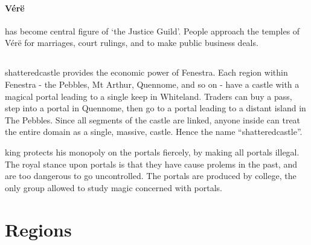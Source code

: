 \begin{multicols}{2}
\paragraph{V\'{e}r\"{e}} has become central figure of `the Justice Guild'.
People approach the temples of V\'{e}r\"{e} for marriages, court rulings, and to make public business deals.

\subsection{}

\Gls{shatteredcastle} provides the economic power of Fenestra.
Each region within Fenestra - the Pebbles, Mt Arthur, Quennome, and so on - have a castle with a magical portal leading to a single keep in Whiteland.
Traders can buy a pass, step into a portal in Quennome, then go to a portal leading to a distant island in The Pebbles.
Since all segments of the castle are linked, anyone inside can treat the entire domain as a single, massive, castle.
Hence the name ``\gls{shatteredcastle}''.

\Gls{king} protects his monopoly on the portals fiercely, by making all portals illegal.
The royal stance upon portals is that they have cause prolems in the past, and are too dangerous to go uncontrolled.
The portals are produced by \gls{college}, the only group allowed to study magic concerned with portals.

\end{multicols}

\section{Regions}\label{encounters}

